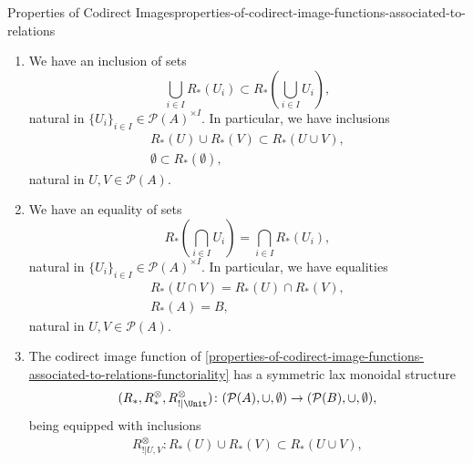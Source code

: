 \begin{proposition}{Properties of Codirect Images}{properties-of-codirect-image-functions-associated-to-relations}
\begin{enumerate}
\begin{itemize}
            \end{itemize}
        \item\label{properties-of-codirect-image-functions-associated-to-relations-lax-preservation-of-colimits}We have an inclusion of sets
            \[
                \bigcup_{i\in I}R_{*}(U_{i})%
                \subset%
                R_{*}(\bigcup_{i\in I}U_{i}),%
            \]%
            natural in $\{U_{i}\}_{i\in I}\in\mathcal{P}(A)^{\times I}$. In particular, we have inclusions%
            \[
                \begin{gathered}
                    R_{*}(U)\cup R_{*}(V) \subset R_{*}(U\cup V),\\
                    \emptyset             \subset R_{*}(\emptyset),
                \end{gathered}
            \]%
            natural in $U,V\in\mathcal{P}(A)$.
        \item\label{properties-of-codirect-image-functions-associated-to-relations-preservation-of-limits}We have an equality of sets
            \[
                    R_{*}(\bigcap_{i\in I}U_{i})%
                    =%
                    \bigcap_{i\in I}R_{*}(U_{i}),%
            \]%
            natural in $\{U_{i}\}_{i\in I}\in\mathcal{P}(A)^{\times I}$. In particular, we have equalities%
            \[
                \begin{gathered}
                    R_{*}(U\cap V) = R_{*}(U)\cap R_{*}(V),\\
                    R_{*}(A)       = B,
                \end{gathered}
            \]%
            natural in $U,V\in\mathcal{P}(A)$.
        \item\label{properties-of-codirect-image-functions-associated-to-relations-symmetric-lax-monoidality-with-respect-to-unions}The codirect image function of \cref{properties-of-codirect-image-functions-associated-to-relations-functoriality} has a symmetric lax monoidal structure
            \[
                (R_{*},R^{\otimes}_{*},R^{\otimes}_{!|\Unit})
                \colon
                (\mathcal{P}(A),\cup,\emptyset)
                \to
                (\mathcal{P}(B),\cup,\emptyset),
            \]%
            being equipped with inclusions%
            \[
                \begin{gathered}
                    R^{\otimes}_{!|U,V}   \colon R_{*}(U)\cup R_{*}(V) \subset R_{*}(U\cup V),\\

\end{gathered}\]
\end{enumerate}
\end{proposition}
